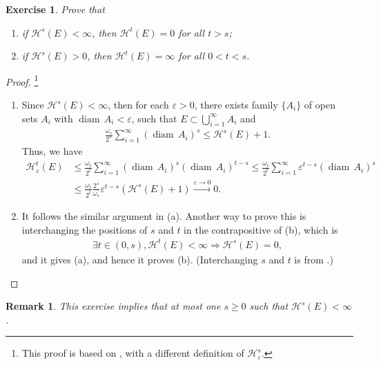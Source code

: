 \documentclass[11pt]{book}
\newtheorem{exercise}{Exercise}[section]
\newtheorem{remark}{Remark}[chapter]
\theoremstyle{definition}
\numberwithin{equation}{chapter}
\def\H{{\mathcal H}}
\def\diam{{\operatorname{diam}\,}}
\begin{document}
\begin{exercise}\label{exercise_151}
Prove that
\begin{enumerate}[label=(\alph*)]
    \item if $\mathcal{H}^s(E) < \infty$, then $\mathcal{H}^t(E) = 0$ for all $t > s$;
    
    \item if $\mathcal{H}^s(E) > 0$, then $\mathcal{H}^t(E) = \infty$ for all $0 < t < s$.
\end{enumerate}
\end{exercise}
\begin{proof}\footnote{This proof is based on \cite{12}, with a different definition of $\mathcal{H}^s_{\varepsilon}$.}
~\begin{enumerate}[label=(\alph*)]
    \item Since $\H^s(E) < \infty$, then for each $\varepsilon > 0$, there exists family $\{A_i\}$ of open sets $A_i$ with $\diam A_i < \varepsilon$, such that $E \subset \bigcup^\infty_{i=1} A_i$ and
    \begin{align*}
        \frac{\omega_s}{2^s} \sum^\infty_{i=1} (\diam A_i)^s \leq \H^s(E) + 1.
    \end{align*}
    Thus, we have
    \begin{align*}
        \H^t_{\varepsilon}(E) & \leq \frac{\omega_t}{2^t} \sum^\infty_{i=1} (\diam A_i)^s (\diam A_i)^{t - s} \leq \frac{\omega_t}{2^t} \sum^\infty_{i=1} \varepsilon^{t - s} (\diam A_i)^s \\
        & \leq \frac{\omega_t}{2^t} \frac{2^s}{\omega_s} \varepsilon^{t-s} \left( \H^s(E) + 1\right) \xrightarrow[]{\varepsilon \to 0} 0.
    \end{align*}
    
    \item It follows the similar argument in (a). Another way to prove this is interchanging the positions of $s$ and $t$ in the contrapositive of (b), which is 
    \begin{align*}
        \exists t \in (0,s), \H^t(E) < \infty \Longrightarrow \H^s(E) = 0,
    \end{align*}
    and it gives (a), and hence it proves (b). (Interchanging $s$ and $t$ is from \cite{13}.)
\end{enumerate}
\end{proof}

\medskip

\begin{remark}
This exercise implies that at most one $s \geq 0$ such that $\mathcal{H}^s(E) < \infty$.
\end{remark}
\end{document}
